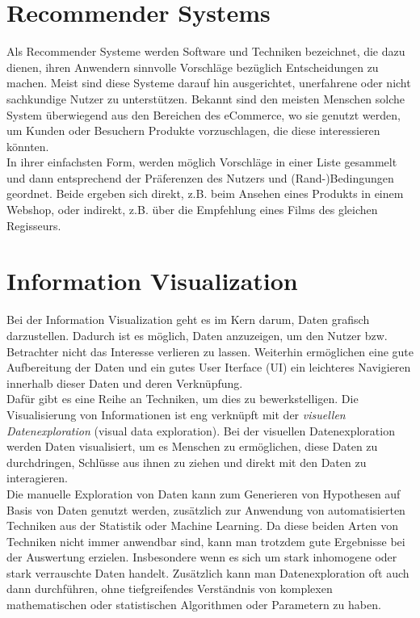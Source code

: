 	\section{Recommender Systems}
	Als Recommender Systeme werden Software und Techniken bezeichnet, die dazu
	dienen, ihren Anwendern sinnvolle Vorschläge bezüglich Entscheidungen zu machen. Meist sind diese Systeme darauf hin ausgerichtet, unerfahrene oder nicht sachkundige Nutzer zu unterstützen. \cite{Fra10}  Bekannt sind den meisten Menschen solche System überwiegend aus den Bereichen des eCommerce, wo sie genutzt werden, um Kunden oder Besuchern Produkte vorzuschlagen, die diese interessieren könnten.\\
	In ihrer einfachsten Form, werden möglich Vorschläge in einer Liste gesammelt und dann entsprechend der Präferenzen des Nutzers und (Rand-)Bedingungen geordnet. Beide ergeben sich direkt, z.B. beim Ansehen eines Produkts in einem Webshop, oder indirekt, z.B. über die Empfehlung eines Films des gleichen Regisseurs. \cite{Fra10} 
	
	\section{Information Visualization}
	Bei der Information Visualization geht es im Kern darum, Daten grafisch
	darzustellen. Dadurch ist es möglich, Daten anzuzeigen, um den
	Nutzer bzw. Betrachter nicht das Interesse verlieren zu lassen. Weiterhin ermöglichen eine gute Aufbereitung der Daten und ein
	gutes User Iterface (UI) ein leichteres Navigieren innerhalb dieser Daten und deren Verknüpfung.\\
	Dafür gibt es eine Reihe an Techniken, um dies zu bewerkstelligen. Die
	Visualisierung von Informationen ist eng verknüpft mit der \textit{visuellen
	Datenexploration} (visual data exploration).
	Bei der visuellen Datenexploration werden Daten visualisiert, um es Menschen zu
	ermöglichen, diese Daten zu durchdringen, Schlüsse aus ihnen zu ziehen und direkt mit den Daten zu interagieren. \cite{Kei02}\\ Die manuelle Exploration von Daten kann zum Generieren von Hypothesen auf Basis von Daten genutzt werden, zusätzlich zur Anwendung von automatisierten Techniken aus der Statistik oder Machine Learning. Da diese beiden Arten von Techniken nicht immer anwendbar sind, kann man trotzdem gute Ergebnisse bei der Auswertung erzielen. Insbesondere wenn es  sich um stark inhomogene oder stark verrauschte Daten handelt. Zusätzlich kann man Datenexploration oft auch dann durchführen, ohne tiefgreifendes Verständnis von komplexen  mathematischen oder statistischen Algorithmen oder Parametern zu haben. \cite{Kei02} 